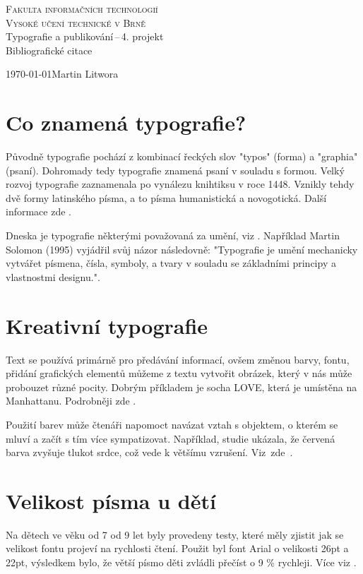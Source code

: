 \documentclass[a4paper,11pt]{article}
\begin{document}
\begin{titlepage}
\begin{center}
\Huge
\textsc{Fakulta informačních technologií}\\
\textsc{Vysoké učení technické v Brně}\\
\huge
Typografie a publikování\,--\,4. projekt\\
\Huge
Bibliografické citace\\
\end{center}
{\LARGE \today \hfill Martin Litwora}
\end{titlepage}


\section{Co znamená typografie?}
Původně typografie pochází z kombinací řeckých slov "typos" (forma) a "graphia" (psaní). Dohromady tedy typografie znamená psaní v souladu s formou. Velký rozvoj typografie zaznamenala po vynálezu knihtiksu v roce 1448. Vznikly tehdy dvě formy latinského písma, a to písma humanistická a novogotická. Další informace zde \cite{historie}.

Dneska je typografie některými považovaná za umění, viz \cite{clanek_konference1}. Například Martin Solomon (1995) vyjádřil svůj názor následovně: "Typografie je umění mechanicky vytvářet písmena, čísla,  symboly, a tvary v souladu se základními principy a vlastnostmi designu."\cite{Solomon}.

\section{Kreativní typografie}
Text se používá primárně pro předávání informací, ovšem změnou barvy, fontu, přidání grafických elementů můžeme z textu vytvořit obrázek, který v nás může probouzet různé pocity. Dobrým příkladem je socha LOVE, která je umístěna na Manhattanu. Podrobněji zde \cite{creative_typography}.

Použití barev může čtenáři napomoct navázat vztah s objektem, o kterém se mluví a začít s tím více sympatizovat. Například, studie ukázala, že červená barva zvyšuje tlukot srdce, což vede k většímu vzrušení. Viz~zde~\cite{Donev}. 

\section{Velikost písma u dětí}
Na dětech ve věku od 7 od 9 let byly provedeny testy, které měly zjistit jak se velikost fontu projeví na rychlosti čtení. Použit byl font Arial o velikosti 26pt a 22pt, výsledkem bylo, že větší písmo děti zvládli přečíst o 9 \% rychleji. Více viz \cite{kids}.
\end{document}
